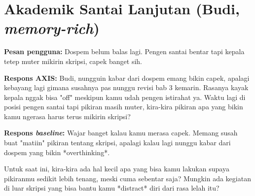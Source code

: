 \section{Akademik Santai Lanjutan (Budi, \textit{memory-rich})}

\textbf{Pesan pengguna:} Dospem belum balas lagi. Pengen santai bentar tapi kepala tetep muter mikirin skripsi, capek banget sih.

\textbf{Respons AXIS:} Budi, nungguin kabar dari dospem emang bikin capek, apalagi kebayang lagi gimana susahnya pas nunggu revisi bab 3 kemarin. Rasanya kayak kepala nggak bisa "off" meskipun kamu udah pengen istirahat ya. Waktu lagi di posisi pengen santai tapi pikiran masih muter, kira-kira pikiran apa yang bikin kamu ngerasa harus terus mikirin skripsi?

\textbf{Respons \textit{baseline}:} Wajar banget kalau kamu merasa capek. Memang susah buat "matiin" pikiran tentang skripsi, apalagi kalau lagi nunggu kabar dari dospem yang bikin *overthinking*.

Untuk saat ini, kira-kira ada hal kecil apa yang bisa kamu lakukan supaya pikiranmu sedikit lebih tenang, meski cuma sebentar saja? Mungkin ada kegiatan di luar skripsi yang bisa bantu kamu *distract* diri dari rasa lelah itu?

